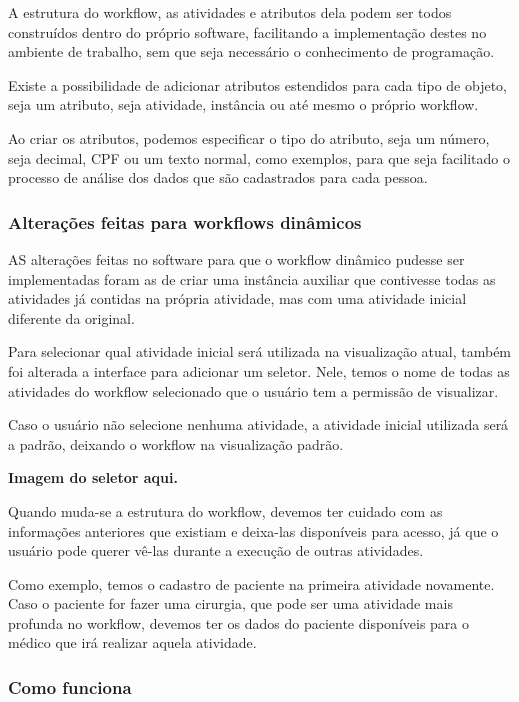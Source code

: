 A estrutura do workflow, as atividades e atributos dela podem ser todos construídos dentro do próprio software, facilitando a implementação destes no ambiente de trabalho, sem que seja necessário o conhecimento de programação.

Existe a possibilidade de adicionar atributos estendidos para cada tipo de objeto, seja um atributo, seja atividade, instância ou até mesmo o próprio workflow.

Ao criar os atributos, podemos especificar o tipo do atributo, seja um número, seja decimal, CPF ou um texto normal, como exemplos, para que seja facilitado o processo de análise dos dados que são cadastrados para cada pessoa.

 \subsubsection{Alterações feitas para workflows dinâmicos}

AS alterações feitas no software para que o workflow dinâmico pudesse ser implementadas foram as de criar uma instância auxiliar que contivesse todas as atividades já contidas na própria atividade, mas com uma atividade inicial diferente da original.

Para selecionar qual atividade inicial será utilizada na visualização atual, também foi alterada a interface para adicionar um seletor. Nele, temos o nome de todas as atividades do workflow selecionado que o usuário tem a permissão de visualizar.

Caso o usuário não selecione nenhuma atividade, a atividade inicial utilizada será a padrão, deixando o workflow na visualização padrão.

\textbf{Imagem do seletor aqui.}

Quando muda-se a estrutura do workflow, devemos ter cuidado com as informações anteriores que existiam e deixa-las disponíveis para acesso, já que o usuário pode querer vê-las durante a execução de outras atividades.

Como exemplo, temos o cadastro de paciente na primeira atividade novamente. Caso o paciente for fazer uma cirurgia, que pode ser uma atividade mais profunda no workflow, devemos ter os dados do paciente disponíveis para o médico que irá realizar aquela atividade.

\subsubsection{Como funciona}

